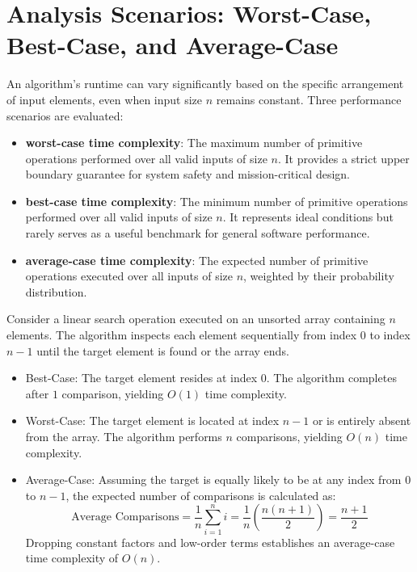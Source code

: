 \documentclass[12pt]{report}
\begin{document}
\section{Analysis Scenarios: Worst-Case, Best-Case, and Average-Case}

An algorithm's runtime can vary significantly based on the specific arrangement of input elements, even when input size $n$ remains constant. Three performance scenarios are evaluated:

\begin{itemize}
    \item \textbf{worst-case time complexity}: The maximum number of primitive operations performed over all valid inputs of size $n$. It provides a strict upper boundary guarantee for system safety and mission-critical design.
    \item \textbf{best-case time complexity}: The minimum number of primitive operations performed over all valid inputs of size $n$. It represents ideal conditions but rarely serves as a useful benchmark for general software performance.
    \item \textbf{average-case time complexity}: The expected number of primitive operations executed over all inputs of size $n$, weighted by their probability distribution.
\end{itemize}

Consider a linear search operation executed on an unsorted array containing $n$ elements. The algorithm inspects each element sequentially from index $0$ to index $n-1$ until the target element is found or the array ends.

\begin{itemize}
    \item Best-Case: The target element resides at index $0$. The algorithm completes after $1$ comparison, yielding $O(1)$ time complexity.
    \item Worst-Case: The target element is located at index $n-1$ or is entirely absent from the array. The algorithm performs $n$ comparisons, yielding $O(n)$ time complexity.
    \item Average-Case: Assuming the target is equally likely to be at any index from $0$ to $n-1$, the expected number of comparisons is calculated as:
    \[
    \text{Average Comparisons} = \frac{1}{n} \sum_{i=1}^{n} i = \frac{1}{n} \left( \frac{n(n+1)}{2} \right) = \frac{n+1}{2}
    \]
    Dropping constant factors and low-order terms establishes an average-case time complexity of $O(n)$.
\end{itemize}
\end{document}
